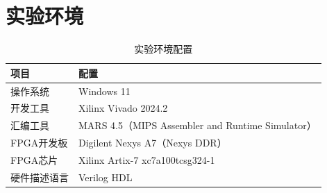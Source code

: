 \section{实验环境}

\begin{table}[H]
    \centering
    \caption{实验环境配置}
    \begin{tabular}{ll}
        \toprule
        \textbf{项目} & \textbf{配置} \\
        \midrule
        操作系统 & Windows 11 \\
        开发工具 & Xilinx Vivado 2024.2 \\  
        汇编工具 & MARS 4.5（MIPS Assembler and Runtime Simulator） \\
        FPGA开发板 & Digilent Nexys A7（Nexys DDR） \\
        FPGA芯片 & Xilinx Artix-7 xc7a100tcsg324-1 \\
        硬件描述语言 & Verilog HDL \\
        \bottomrule
    \end{tabular}
\end{table}
